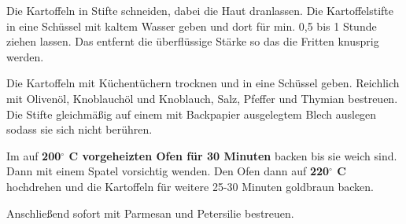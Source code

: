 \vspace*{\fill}
\begin{multicols}{2}


Die Kartoffeln in Stifte schneiden, dabei die Haut dranlassen.
Die Kartoffelstifte in eine Schüssel mit kaltem Wasser geben und dort für min. 0,5 bis 1 Stunde
ziehen lassen. Das entfernt die überflüssige Stärke so das die Fritten knusprig werden.\newline

Die Kartoffeln mit Küchentüchern trocknen und in eine Schüssel geben.
Reichlich mit Olivenöl, Knoblauchöl und Knoblauch, Salz, Pfeffer und Thymian
bestreuen.\newline
Die Stifte gleichmäßig auf einem mit Backpapier ausgelegtem Blech  
auslegen sodass sie sich nicht berühren.\newline

Im auf \textbf{200$^\circ$ C vorgeheizten Ofen für 30 Minuten} backen bis
sie weich sind. Dann mit einem Spatel vorsichtig wenden.
Den Ofen dann auf \textbf{220$^\circ$ C} hochdrehen und die Kartoffeln
für weitere 25-30 Minuten goldbraun backen.\newline

Anschließend sofort mit Parmesan und Petersilie bestreuen.



\end{multicols}
\vfill
